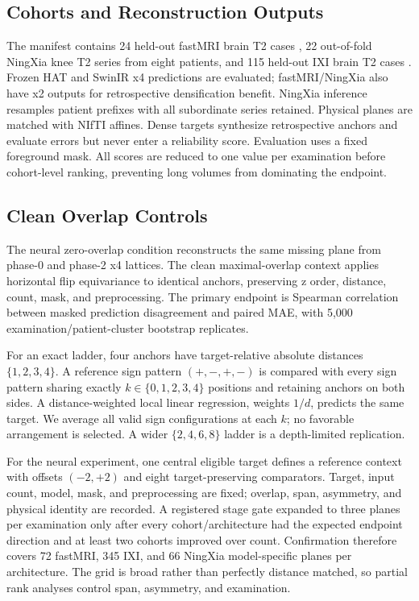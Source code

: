 \documentclass[10pt,twocolumn,letterpaper]{article}
\begin{document}
\subsection{Cohorts and Reconstruction Outputs}
The manifest contains 24 held-out fastMRI brain T2 cases \cite{knoll2020fastmri}, 22 out-of-fold NingXia knee T2 series from eight patients, and 115 held-out IXI brain T2 cases \cite{ixi_dataset}. Frozen HAT and SwinIR x4 predictions are evaluated; fastMRI/NingXia also have x2 outputs for retrospective densification benefit. NingXia inference resamples patient prefixes with all subordinate series retained. Physical planes are matched with NIfTI affines. Dense targets synthesize retrospective anchors and evaluate errors but never enter a reliability score. Evaluation uses a fixed foreground mask. All scores are reduced to one value per examination before cohort-level ranking, preventing long volumes from dominating the endpoint.

\subsection{Clean Overlap Controls}
The neural zero-overlap condition reconstructs the same missing plane from phase-0 and phase-2 x4 lattices. The clean maximal-overlap context applies horizontal flip equivariance to identical anchors, preserving z order, distance, count, mask, and preprocessing. The primary endpoint is Spearman correlation between masked prediction disagreement and paired MAE, with 5,000 examination/patient-cluster bootstrap replicates.

For an exact ladder, four anchors have target-relative absolute distances $\{1,2,3,4\}$. A reference sign pattern $(+,-,+,-)$ is compared with every sign pattern sharing exactly $k\in\{0,1,2,3,4\}$ positions and retaining anchors on both sides. A distance-weighted local linear regression, weights $1/d$, predicts the same target. We average all valid sign configurations at each $k$; no favorable arrangement is selected. A wider $\{2,4,6,8\}$ ladder is a depth-limited replication.

For the neural experiment, one central eligible target defines a reference context with offsets $(-2,+2)$ and eight target-preserving comparators. Target, input count, model, mask, and preprocessing are fixed; overlap, span, asymmetry, and physical identity are recorded. A registered stage gate expanded to three planes per examination only after every cohort/architecture had the expected endpoint direction and at least two cohorts improved over count. Confirmation therefore covers 72 fastMRI, 345 IXI, and 66 NingXia model-specific planes per architecture. The grid is broad rather than perfectly distance matched, so partial rank analyses control span, asymmetry, and examination.
\end{document}
